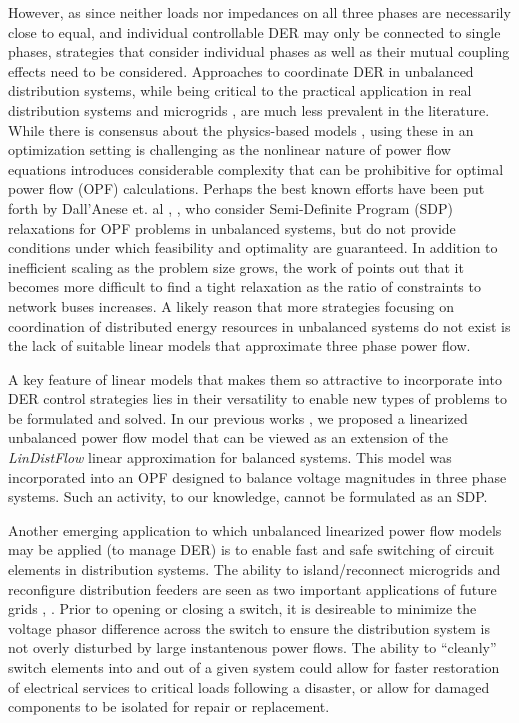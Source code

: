 However, as since neither loads nor impedances on all three phases are necessarily close to equal, and individual controllable DER may only be connected to single phases, strategies that consider individual phases as well as their mutual coupling effects need to be considered.  Approaches to coordinate DER in unbalanced distribution systems, while being critical to the practical application in real distribution systems and microgrids \cite{doe2015ADMS}, are much less prevalent in the literature.  
While there is consensus about the physics-based models \cite{kersting2012distribution}, using these in an optimization setting is challenging as the nonlinear nature of power flow equations introduces considerable complexity that can be prohibitive for optimal power flow (OPF) calculations. Perhaps the best known efforts have been put forth by Dall'Anese et. al \cite{dall2012optimization}, \cite{dall2013distributed}, who consider Semi-Definite Program (SDP) relaxations for OPF problems in unbalanced systems, but do not provide conditions under which feasibility and optimality are guaranteed.  In addition to inefficient scaling as the problem size grows, the work of \cite{bitar2014} points out that it becomes more difficult to find a tight relaxation as the ratio of constraints to network buses increases.  A likely reason that more strategies focusing on coordination of distributed energy resources in unbalanced systems do not exist is the lack of suitable linear models that approximate three phase power flow.

A key feature of linear models that makes them so attractive to incorporate into DER control strategies lies in their versatility to enable new types of problems to be formulated and solved.  In our previous works \cite{arnold2015optimal} \cite{sankur2016linear}, we proposed a linearized unbalanced power flow model that can be viewed as an extension of the \emph{LinDistFlow} \cite{baran1989optimal} linear approximation for balanced systems.  This model was incorporated into an OPF designed to balance voltage magnitudes in three phase systems.  Such an activity, to our knowledge, cannot be formulated as an SDP.

Another emerging application to which unbalanced linearized power flow models may be applied (to manage DER) is to enable fast and safe switching of circuit elements in distribution systems.  The ability to island/reconnect microgrids and reconfigure distribution feeders are seen as two important applications of future grids \cite{grid2015}, \cite{quad2015}.  Prior to opening or closing a switch, it is desireable to minimize the voltage phasor difference across the switch to ensure the distribution system is not overly disturbed by large instantenous power flows.  The ability to ``cleanly'' switch elements into and out of a given system could allow for faster restoration of electrical services to critical loads following a disaster, or allow for damaged components to be isolated for repair or replacement.  


